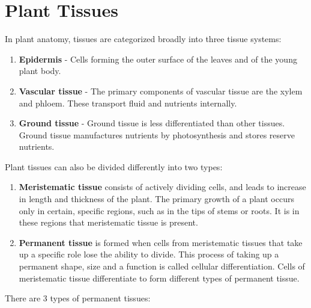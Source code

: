 \documentclass[]{book}
\providecommand{\tightlist}{%
  \setlength{\itemsep}{0pt}\setlength{\parskip}{0pt}}
\theoremstyle{definition}
\theoremstyle{definition}
\theoremstyle{definition}
\theoremstyle{remark}
\begin{document}
\section{Plant Tissues}\label{plant-tissues}

In plant anatomy, tissues are categorized broadly into three tissue
systems:

\begin{enumerate}
\def\labelenumi{\arabic{enumi}.}
\tightlist
\item
  \textbf{Epidermis} - Cells forming the outer surface of the leaves and
  of the young plant body.
\item
  \textbf{Vascular tissue} - The primary components of vascular tissue
  are the xylem and phloem. These transport fluid and nutrients
  internally.
\item
  \textbf{Ground tissue} - Ground tissue is less differentiated than
  other tissues. Ground tissue manufactures nutrients by photosynthesis
  and stores reserve nutrients.
\end{enumerate}

Plant tissues can also be divided differently into two types:

\begin{enumerate}
\def\labelenumi{\arabic{enumi}.}
\tightlist
\item
  \textbf{Meristematic tissue} consists of actively dividing cells, and
  leads to increase in length and thickness of the plant. The primary
  growth of a plant occurs only in certain, specific regions, such as in
  the tips of stems or roots. It is in these regions that meristematic
  tissue is present.
\item
  \textbf{Permanent tissue} is formed when cells from meristematic
  tissues that take up a specific role lose the ability to divide. This
  process of taking up a permanent shape, size and a function is called
  cellular differentiation. Cells of meristematic tissue differentiate
  to form different types of permanent tissue.
\end{enumerate}

There are 3 types of permanent tissues:
\end{document}
